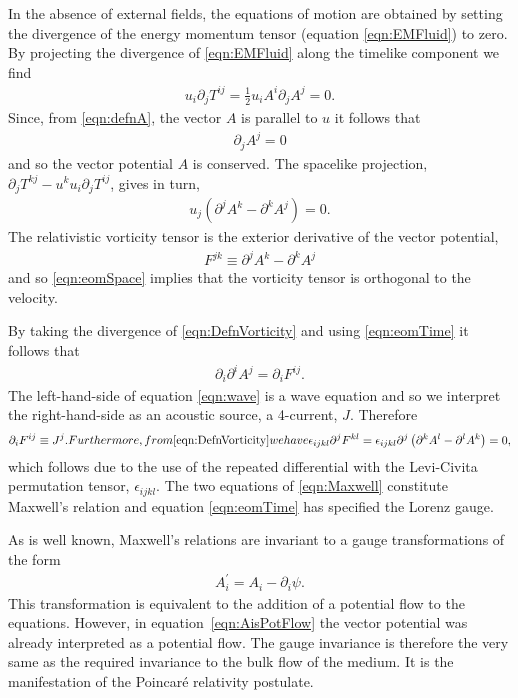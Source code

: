 \documentclass[10pt, fleqn,final,showtrims,oldfontcommands, article,a4paper,oneside]{memoir} %
\newcommand{\sub}[1]{\begin{subequations}#1\end{subequations}}
\newcommand{\eqa}[1]{\begin{align}#1\end{align}}
\newcommand{\eqal}[2]{\begin{align}#1\label{eqn:#2}\end{align}}
\newcommand{\eqnref}[1]{\ref{eqn:#1}}
\newcommand{\lr}[1]{\left( #1 \right)}
\renewcommand{\d}{\partial}
\newcommand{\del}{\nabla}
\newcommand{\scope}[1]{\tilde{#1}}
\newcommand{\half}{\tfrac{1}{2}}
\newcommand{\Poincare}{Poincar{\'e}\xspace}
\begin{document}
In the absence of external fields, the equations of motion are obtained by setting the 
 divergence of the energy momentum tensor (equation \eqnref{EMFluid}) to zero.
By projecting the divergence of \eqnref{EMFluid} along the timelike component we find
\eqa{
  u_i \d_j T^{i j} = \half u_i A^i \d_j A^j = 0.
}
Since, from \eqnref{defnA}, the vector $A$ is parallel to $u$  it follows that 
\eqal{
  \d_j A^j = 0
}{eomTime}
and so the vector potential $A$ is conserved.
The spacelike projection,
$\d_j T^{k j} - u^k u_i \d_j T^{i j}$, gives in turn,
\eqal{
u_j \lr{\d^j A^k - \d^k A^j} = 0.
}{eomSpace}
The relativistic vorticity tensor is the exterior derivative  of the vector potential, 
\eqal{
F^{j k} \equiv \d^j A^k - \d^k A^j
}{DefnVorticity}
and so \eqnref{eomSpace} implies that the vorticity tensor is orthogonal to the velocity.

By taking the divergence of \eqnref{DefnVorticity} and using \eqnref{eomTime} it follows that 
\eqal{
  \d_i \d^i A^j = \d_i F^{i j}.
}{wave}
The left-hand-side of equation \eqnref{wave} is a wave equation and so we interpret the right-hand-side as an acoustic source,
a 4-current, $J$.
Therefore 
\sub{
\label{eqn:Maxwell}
\eqa{
  \d_i F^{i j} \equiv J^j.
}
Furthermore, from \eqnref{DefnVorticity} we have
\begin{align}
  \epsilon_{i j k l} \d^j F^{k l} = \epsilon_{i j k l} \d^j \lr{\d^k A^l - \d^l A^k} = 0,
\end{align}
}
which follows due to the use of the repeated differential with the Levi-Civita permutation tensor, $\epsilon_{i j k l}$.
The two equations of \eqnref{Maxwell} constitute Maxwell's relation and equation \eqnref{eomTime} has specified the Lorenz gauge.

As is well known, Maxwell's relations are invariant to a gauge transformations of the form
\begin{align}
  A_i^\prime = A_i - \d_i \psi.
\end{align}
This transformation is equivalent to the addition of a potential flow to the equations.
However, in equation~\eqnref{AisPotFlow} the vector potential was already interpreted as a potential flow.
The gauge invariance is therefore the very same as the required invariance to the bulk flow of the medium.
It is the manifestation of the \Poincare relativity postulate.
\end{document}
